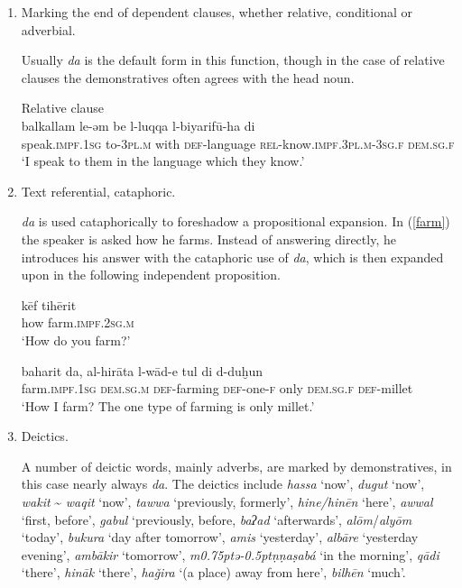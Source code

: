 \documentclass[output=paper]{langsci/langscibook}
\begin{document}
\begin{enumerate}[leftmargin=*]

\item Marking the end of dependent clauses, whether {relative}, {conditional} or adverbial.

Usually \textit{da} is the default form in this function, though in the case of {relative} clauses the {demonstratives} often agrees with the head noun.

\ea\label{luqqa}
{}{}{\label{bkm:Ref520916704}Relative clause}\\
\gll balkallam le-əm be l-luqqa l-biyarifū-ha di\\
     speak.\textsc{impf.1sg} to-\textsc{3pl.m} with \textsc{def}-language \textsc{rel-}know.\textsc{impf.3pl.m-3sg.f} \textsc{dem.sg.f}\\
\glt ‘I speak to them in the language which they know.’
\z

\item Text referential, cataphoric.

\textit{da} is used cataphorically to foreshadow a propositional expansion. In (\ref{farm}) the speaker is asked how he farms. Instead of answering directly, he introduces his answer with the cataphoric use of \textit{da}, which is then expanded upon in the following independent proposition.

\ea\label{farm}
\ea
\gll kēf tihērit\\
     how farm.\textsc{impf.2sg.m}\\
\glt ‘How do you farm?’

\ex
\gll baharit da, al-hirāta l-wād-e tul di d-duḫun\\
     farm.\textsc{impf.1sg} \textsc{dem.sg.m} \textsc{def-}farming \textsc{def-}one-\textsc{f} only \textsc{dem.sg.f} \textsc{def-}millet\\
\glt ‘How I farm? The one type of farming is only millet.’\label{tul}
\z
\z

\item Deictics.

A number of deictic words, mainly adverbs, are marked by {demonstratives}, in this case nearly always \textit{da}. The deictics include \textit{hassa} ‘now’, \textit{dugut} ‘now’, \textit{wakit} {\textasciitilde}  \textit{waqit} ‘now’, \textit{tawwa} ‘previously, formerly’, \textit{hine/hinēn} ‘here’, \textit{awwal} ‘first, before’, \textit{gabul} ‘previously, before, \textit{baʔad} ‘afterwards’, \textit{alōm}/\textit{alyōm} ‘today’, \textit{bukura} ‘day after tomorrow’, \textit{amis} ‘yesterday’, \textit{albāre} ‘yesterday evening’, \textit{ambākir} ‘tomorrow’, \textit{m\kern 0.75ptǝ\kern -0.5ptṇṇaṣabá} ‘in the morning’, \textit{qādi} ‘there’, \textit{hināk} ‘there’, \textit{haǧira} ‘(a place) away from here’, \textit{bilhēn} ‘much’.


\end{enumerate}
\end{document}
